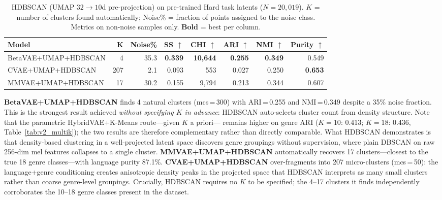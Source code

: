 \documentclass{article}
\begin{document}
\begin{table}[H]
\centering
\caption{HDBSCAN (UMAP $32\!\to\!10$d pre-projection) on pre-trained Hard task latents
($N\!=\!20{,}019$). $K$ = number of clusters found automatically; Noise\% = fraction of
points assigned to the noise class. Metrics on non-noise samples only. \textbf{Bold} = best per column.}
\label{tab:hdbscan}
\small
\begin{tabular}{lrrrrrrr}
\toprule
\textbf{Model} & \textbf{K} & \textbf{Noise\%} & \textbf{SS $\uparrow$} & \textbf{CHI $\uparrow$} & \textbf{ARI $\uparrow$} & \textbf{NMI $\uparrow$} & \textbf{Purity $\uparrow$} \\
\midrule
BetaVAE+UMAP+HDBSCAN & 4   & 35.3 & \textbf{0.339} & \textbf{10,644} & \textbf{0.255} & \textbf{0.349} & 0.549 \\
CVAE+UMAP+HDBSCAN    & 207 &  2.1 & 0.093          & 553             & 0.027          & 0.250          & \textbf{0.653} \\
MMVAE+UMAP+HDBSCAN   & 17  & 30.2 & 0.155          & 9,794           & 0.213          & 0.344          & 0.607 \\
\bottomrule
\end{tabular}
\end{table}

\textbf{BetaVAE+UMAP+HDBSCAN} finds 4 natural clusters (mcs\,=\,300) with ARI\,=\,0.255
and NMI\,=\,0.349 despite a 35\% noise fraction. This is the strongest result achieved
\emph{without specifying $K$ in advance}: HDBSCAN auto-selects cluster count from density
structure. Note that the parametric HybridVAE+K-Means route---given $K$ a priori---
remains higher on genre ARI ($K\!=\!10$: 0.413; $K\!=\!18$: 0.436, Table~\ref{tab:v2_multik});
the two results are therefore complementary rather than directly comparable. What HDBSCAN
demonstrates is that density-based clustering in a well-projected latent space discovers
genre groupings without supervision, where plain DBSCAN on raw 256-dim mel features
collapses to a single cluster.
\textbf{MMVAE+UMAP+HDBSCAN} automatically recovers 17 clusters---closest to the true
18 genre classes---with language purity 87.1\%.
\textbf{CVAE+UMAP+HDBSCAN} over-fragments into 207 micro-clusters (mcs\,=\,50): the
language+genre conditioning creates anisotropic density peaks in the projected space that
HDBSCAN interprets as many small clusters rather than coarse genre-level groupings.
Crucially, HDBSCAN requires no $K$ to be specified; the 4--17 clusters it finds
independently corroborates the 10--18 genre classes present in the dataset.
\end{document}
